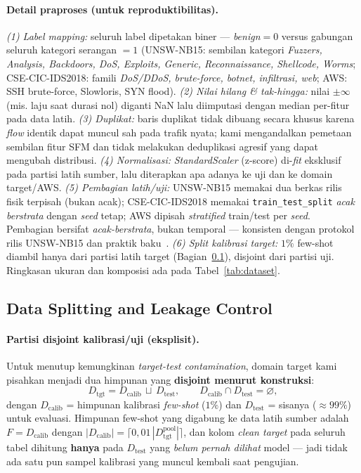 \documentclass[11pt,a4paper]{article}
\begin{document}
\paragraph{Detail praproses (untuk reproduktibilitas).} \emph{(1) Label mapping:}
seluruh label dipetakan biner --- \emph{benign}$=0$ versus gabungan seluruh
kategori serangan $=1$ (UNSW-NB15: sembilan kategori \emph{Fuzzers, Analysis,
Backdoors, DoS, Exploits, Generic, Reconnaissance, Shellcode, Worms}; CSE-CIC-IDS2018:
famili \emph{DoS/DDoS, brute-force, botnet, infiltrasi, web}; AWS: SSH brute-force,
Slowloris, SYN flood). \emph{(2) Nilai hilang \& tak-hingga:} nilai $\pm\infty$
(mis. laju saat durasi nol) diganti NaN lalu diimputasi dengan median per-fitur pada
data latih. \emph{(3) Duplikat:} baris duplikat tidak dibuang secara khusus karena
\emph{flow} identik dapat muncul sah pada trafik nyata; kami mengandalkan pemetaan
sembilan fitur SFM dan tidak melakukan deduplikasi agresif yang dapat mengubah
distribusi. \emph{(4) Normalisasi:} \emph{StandardScaler} (z-score) di-\emph{fit}
eksklusif pada partisi latih sumber, lalu diterapkan apa adanya ke uji dan ke domain
target/AWS. \emph{(5) Pembagian latih/uji:} UNSW-NB15 memakai dua berkas rilis fisik
terpisah (bukan acak); CSE-CIC-IDS2018 memakai \texttt{train\_test\_split}
\emph{acak berstrata} dengan \emph{seed} tetap; AWS dipisah \emph{stratified}
train/test per \emph{seed}. Pembagian bersifat \emph{acak-berstrata}, bukan temporal
--- konsisten dengan protokol rilis UNSW-NB15 dan praktik baku~\cite{kohavi}.
\emph{(6) Split kalibrasi target:} $1\%$ few-shot diambil hanya dari partisi latih
target (Bagian~\ref{sec:split}), disjoint dari partisi uji. Ringkasan ukuran dan
komposisi ada pada Tabel~\ref{tab:dataset}.


\subsection{Data Splitting and Leakage Control}
\label{sec:split}
\paragraph{Partisi disjoint kalibrasi/uji (eksplisit).} Untuk menutup kemungkinan
\emph{target-test contamination}, domain target kami pisahkan menjadi dua himpunan
yang \textbf{disjoint menurut konstruksi}:
\begin{equation}
D_{\text{tgt}} = D_{\text{calib}} \,\sqcup\, D_{\text{test}}, \qquad
D_{\text{calib}} \cap D_{\text{test}} = \varnothing,
\end{equation}
dengan $D_{\text{calib}}$ = himpunan kalibrasi \emph{few-shot} ($1\%$) dan
$D_{\text{test}}$ = sisanya ($\approx 99\%$) untuk evaluasi. Himpunan few-shot yang
digabung ke data latih sumber adalah $F = D_{\text{calib}}$ dengan
$|D_{\text{calib}}| = \lceil 0{,}01\,|D_{\text{tgt}}^{\text{pool}}| \rceil$, dan
kolom \emph{clean target} pada seluruh tabel dihitung \textbf{hanya} pada
$D_{\text{test}}$ yang \emph{belum pernah dilihat} model --- jadi tidak ada satu pun
sampel kalibrasi yang muncul kembali saat pengujian.
\end{document}
